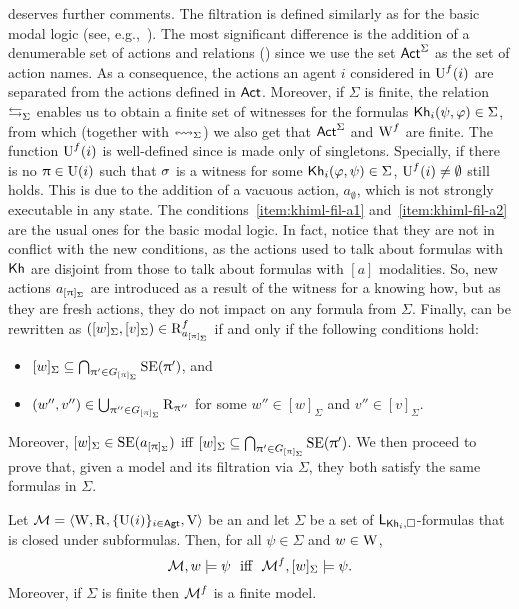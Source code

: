  deserves further comments.
The filtration is defined similarly as for the basic modal logic (see, e.g.,~\cite{mlbook}).
The most significant difference is the addition of a denumerable set of actions and relations () since we use the set ${\rm \sf Act}^\Sigma$ as the set of action names.
As a consequence, the actions an agent $i$ considered in $\operatorname{U}^f(i)$ are separated from the actions defined in ${\rm \sf Act}$.
Moreover, if $\Sigma$ is finite, the relation $\mathrel{\leftrightarrows}_\Sigma$ enables us to obtain a finite set of witnesses for the formulas ${\sf Kh}_i(\psi,\varphi)\in\Sigma$, from which (together with $\leftrightsquigarrow_\Sigma$) we also get that ${\rm \sf Act}^\Sigma$ and $\operatorname{W}^f$ are finite.
The function $\operatorname{U}^f(i)$ is well-defined since is made only of singletons. Specially, if there is no $\uppi \in \operatorname{U}(i)$ such that $\sigma$ is a witness for some ${\sf Kh}_i(\varphi,\psi) \in \Sigma$, $\operatorname{U}^f(i)\neq \emptyset$ still holds.
This is due to the addition of a vacuous action, $a_\emptyset$, which is not strongly executable in any state.
The conditions~\ref{item:khiml-fil-a1} and~\ref{item:khiml-fil-a2} are the usual ones for the basic modal logic.
In fact, notice that they are not in conflict with the new conditions, as the actions used to talk about formulas with ${\sf Kh}$ are disjoint from those to talk about formulas with $[a]$ modalities.
So, new actions $a_{[\uppi]_\Sigma}$ are introduced as a result of the witness for a knowing how, but as they are fresh actions, they do not impact on any formula from $\Sigma$.
Finally,  can be rewritten as $([w]_\Sigma,[v]_\Sigma) \in \operatorname{R}^f_{a_{[\uppi]_\Sigma}}$ if and only if the following conditions hold:

\begin{itemize}
\item $[w]_\Sigma \subseteq \bigcap_{\uppi' \in G_{[\uppi]_\Sigma}} \operatorname{SE}(\uppi')$, and
\item $(w'',v'') \in \bigcup_{\uppi'' \in G_{[\uppi]_\Sigma}} \operatorname{R}_{\uppi''}$ for some $w'' \in [w]_\Sigma$ and $v'' \in [v]_\Sigma$.
\end{itemize}

Moreover, $[w]_\Sigma \in \operatorname{SE}(a_{[\uppi]_\Sigma})$ iff $[w]_\Sigma \subseteq \bigcap_{\uppi' \in G_{[\uppi]_\Sigma}} \operatorname{SE}(\uppi')$.
We then proceed to prove that, given a model and its filtration via $\Sigma$, they both satisfy the same formulas in $\Sigma$.

\medskip

\begin{theorem}\label{th:filtration}
Let $\mathcal{M} = \langle \operatorname{W},\operatorname{R}, \{ \operatorname{U}(i) \}_{i\in {\rm \sf Agt}}, \operatorname{V} \rangle$ be an \ults and
let $\Sigma$ be a set of $\mathsf{L}_{{\sf Kh}_i,\square}$-formulas that is closed under subformulas.
Then, for all $\psi\in\Sigma$ and $w\in\operatorname{W}$, 
\[
    \modults,w\models \psi \ \mbox{  iff  } \ \modults^f,[w]_\Sigma\models \psi.
\] 
Moreover, if $\Sigma$ is finite then $\mathcal{M}^f$ is a finite model.
\end{theorem}

